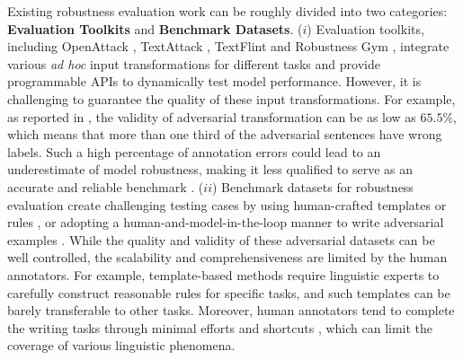 \documentclass{article}
\begin{document}
Existing robustness evaluation work can be roughly divided into two categories:  \textbf{Evaluation Toolkits} and \textbf{Benchmark Datasets}. 
($i$) Evaluation toolkits, including OpenAttack \citep{openattack}, TextAttack \citep{textattack}, TextFlint \citep{textflint} and Robustness Gym \citep{robustnessgym}, integrate various \textit{ad hoc} input transformations for different tasks and provide programmable APIs to dynamically test model performance. 
However, it is challenging to guarantee the quality of these input transformations. 
For example, as reported in \citep{comattack}, the validity of adversarial transformation can be as low as $65.5\%$, which means that more than one third of the adversarial sentences have wrong labels.
Such a high percentage of annotation errors could lead to an underestimate of model robustness, making it less qualified to serve as an accurate and reliable benchmark \citep{criteria}. 
($ii$) Benchmark datasets for robustness evaluation create challenging testing cases by using human-crafted templates or rules \citep{advfever,checklist,stresstest}, or adopting a human-and-model-in-the-loop manner to write adversarial examples \citep{anli,dynabench,dynabenchqa}. 
While the quality and validity of these adversarial datasets can be well controlled, the scalability and comprehensiveness are limited by the human annotators. 
For example, template-based methods require linguistic experts to carefully construct reasonable rules for specific tasks, and such templates can be barely transferable to other tasks. 
Moreover, human annotators tend to complete the writing tasks through minimal efforts and shortcuts \citep{burghardt2020origins,wall2021left}, which can limit the coverage of various linguistic phenomena. 
\end{document}
